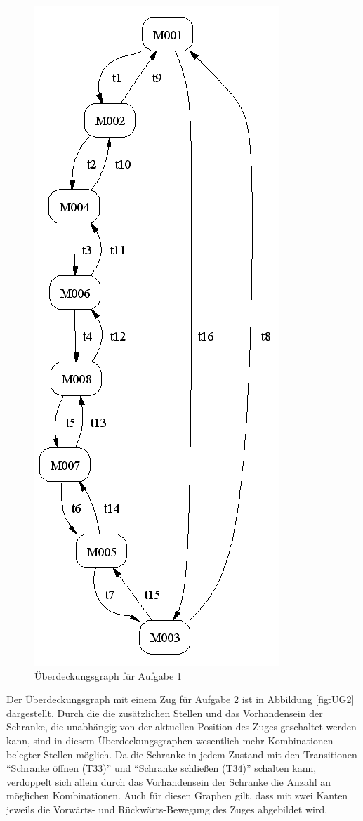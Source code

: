 \documentclass[10pt]{scrartcl}
\begin{document}
\begin{figure}[htbp]
	\centering	\includegraphics[height=1.0\textheight]{Bilder/Aufgabe1_UG.png}
	\caption{Überdeckungsgraph für Aufgabe 1}
	\label{fig:UG1}
\end{figure}

Der Überdeckungsgraph mit einem Zug für Aufgabe 2 ist in Abbildung \ref{fig:UG2} dargestellt. Durch die die zusätzlichen Stellen und das Vorhandensein der Schranke, die unabhängig von der aktuellen Position des Zuges geschaltet werden kann, sind in diesem Überdeckungsgraphen wesentlich mehr Kombinationen belegter Stellen möglich. Da die Schranke in jedem Zustand mit den Transitionen "`Schranke öffnen (T33)"' und "`Schranke schließen (T34)"' schalten kann, verdoppelt sich allein durch das Vorhandensein der Schranke die Anzahl an möglichen Kombinationen. Auch für diesen Graphen gilt, dass mit zwei Kanten jeweils die Vorwärts- und Rückwärts-Bewegung des Zuges abgebildet wird.
\end{document}
